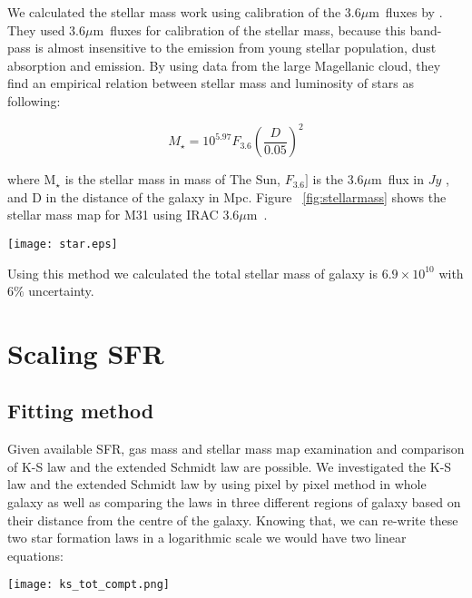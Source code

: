 \documentclass[useAMS,usenatbib]{mn2e}
\newcommand \um    {$\mu$m\ }
\begin{document}
We calculated the stellar mass work using calibration of the 3.6\um fluxes by \cite{Eskew12}. They used 3.6\um fluxes for calibration of the stellar mass, because this band-pass is almost insensitive to the emission from young stellar population, dust absorption and emission. By using data from the large Magellanic cloud, they find an empirical relation between stellar mass and luminosity of stars as following:

\begin{equation}
\label{equ:eskew}
M _{\star}= 10^{5.97} F_{3.6}(\frac{D}{0.05})^2
\end{equation}

where M$_{\star}$ is the stellar mass in mass of The Sun, $F_{3.6}]$ is the 3.6\um flux in $Jy$ , and D in the distance of the galaxy in Mpc. Figure ~\ref{fig:stellarmass} shows the stellar mass map for M31 using IRAC 3.6\um.
\begin{figure*}
\centering
\texttt{[image: star.eps]}
\caption{Stellar Mass surface density. This mass is produced using $IRAC$ 3.6 $\mu$ m data and equation ~\ref{equ:eskew}}
\label{fig:stellarmass}
\end{figure*}

Using this method we calculated the total stellar mass of galaxy is $6.9 \times 10^{10}$ with 6$\%$ uncertainty. %
\section{Scaling SFR}
\subsection{Fitting method}
Given available SFR, gas mass and stellar mass map examination and comparison of K-S law and the extended Schmidt law are possible. We investigated the K-S law and the extended Schmidt law by using  pixel by pixel method in whole galaxy as well as comparing the laws in three different regions of galaxy based on their distance from the centre of the galaxy. Knowing that, we can re-write these two star formation laws in a logarithmic scale we would have two linear equations:

\begin{figure*}
\centering
\texttt{[image: ks\_tot\_compt.png]}
\caption{The result from fitting the Kennicutt-Schmidt law on data from whole galaxy using pixel by pixel method. Pixel size on each plots are different. } %
\label{fig:ks,tot}
\end{figure*}
\end{document}
